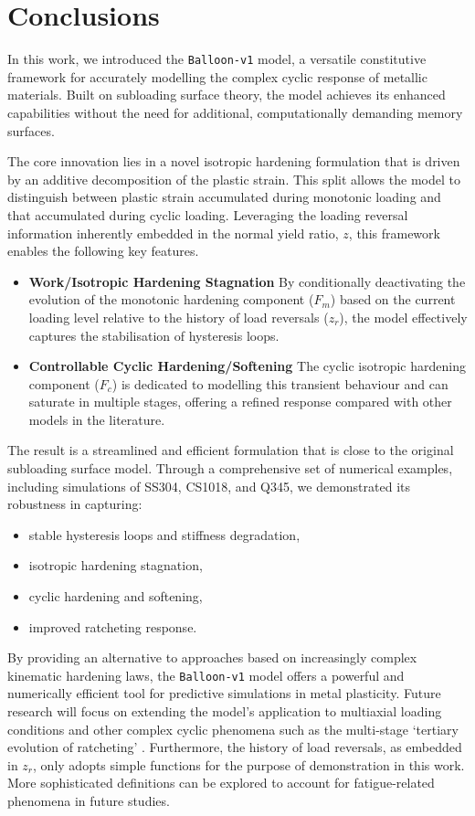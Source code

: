 \section{Conclusions}
In this work, we introduced the \texttt{Balloon-v1} model, a versatile constitutive framework for accurately modelling the complex cyclic response of metallic materials.
Built on subloading surface theory, the model achieves its enhanced capabilities without the need for additional, computationally demanding memory surfaces.

The core innovation lies in a novel isotropic hardening formulation that is driven by an additive decomposition of the plastic strain.
This split allows the model to distinguish between plastic strain accumulated during monotonic loading and that accumulated during cyclic loading.
Leveraging the loading reversal information inherently embedded in the normal yield ratio, $z$, this framework enables the following key features.
\begin{itemize}
    \item \textbf{Work/Isotropic Hardening Stagnation} By conditionally deactivating the evolution of the monotonic hardening component ($F_m$) based on the current loading level relative to the history of load reversals ($z_r$), the model effectively captures the stabilisation of hysteresis loops.
    \item \textbf{Controllable Cyclic Hardening/Softening} The cyclic isotropic hardening component ($F_c$) is dedicated to modelling this transient behaviour and can saturate in multiple stages, offering a refined response compared with other models in the literature.
\end{itemize}

The result is a streamlined and efficient formulation that is close to the original subloading surface model.
Through a comprehensive set of numerical examples, including simulations of SS304, CS1018, and Q345, we demonstrated its robustness in capturing:
\begin{itemize}
    \item stable hysteresis loops and stiffness degradation,
    \item isotropic hardening stagnation,
    \item cyclic hardening and softening,
    \item improved ratcheting response.
\end{itemize}

By providing an alternative to approaches based on increasingly complex kinematic hardening laws, the \texttt{Balloon-v1} model offers a powerful and numerically efficient tool for predictive simulations in metal plasticity.
Future research will focus on extending the model's application to multiaxial loading conditions and other complex cyclic phenomena such as the multi-stage `tertiary evolution of ratcheting' \citep{Kang2008}.
Furthermore, the history of load reversals, as embedded in $z_r$, only adopts simple functions for the purpose of demonstration in this work.
More sophisticated definitions can be explored to account for fatigue-related phenomena in future studies.


